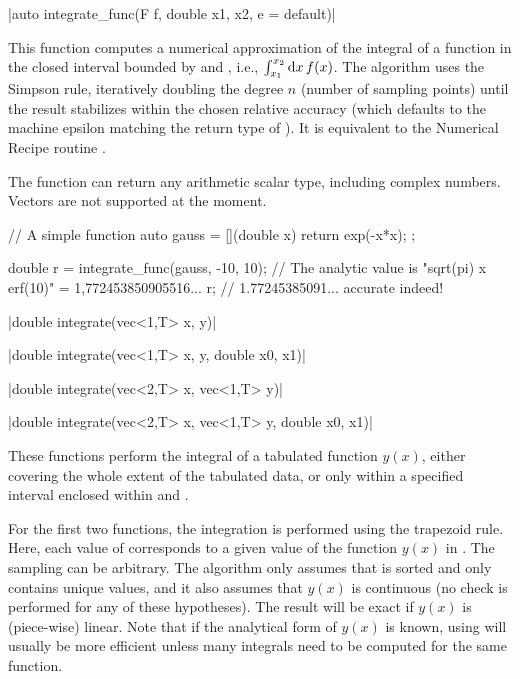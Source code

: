 \funcitem \cppinline|auto integrate_func(F f, double x1, x2, e = default)| 

This function computes a numerical approximation of the integral of a function  in the closed interval bounded by  and , i.e., $\int_{x_1}^{x_2} {\rm d}x\,f(x)$. The algorithm uses the Simpson rule, iteratively doubling the degree $n$ (number of sampling points) until the result stabilizes within the chosen relative accuracy  (which defaults to the machine epsilon matching the return type of ). It is equivalent to the Numerical Recipe routine .

The function  can return any arithmetic scalar type, including complex numbers. Vectors are not supported at the moment.

\begin{example}
\begin{cppcode}
// A simple function
auto gauss = [](double x) {
    return exp(-x*x);
};

double r = integrate_func(gauss, -10, 10);
// The analytic value is "sqrt(pi) x erf(10)" = 1,772453850905516...
r; // 1.77245385091... accurate indeed!
\end{cppcode}
\end{example}

\funcitem \cppinline|double integrate(vec<1,T> x, y)| 

\cppinline|double integrate(vec<1,T> x, y, double x0, x1)|

\cppinline|double integrate(vec<2,T> x, vec<1,T> y)|

\cppinline|double integrate(vec<2,T> x, vec<1,T> y, double x0, x1)|

These functions perform the integral of a tabulated function $y(x)$, either covering the whole extent of the tabulated data, or only within a specified interval enclosed within  and .

For the first two functions, the integration is performed using the trapezoid rule. Here, each value of  corresponds to a given value of the function $y(x)$ in . The sampling can be arbitrary. The algorithm only assumes that  is sorted and only contains unique values, and it also assumes that $y(x)$ is continuous (no check is performed for any of these hypotheses). The result will be exact if $y(x)$ is (piece-wise) linear. Note that if the analytical form of $y(x)$ is known, using  will usually be more efficient unless many integrals need to be computed for the same function.

